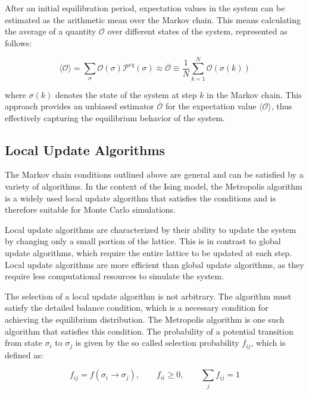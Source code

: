 After an initial equilibration period, expectation values in the system can be
estimated as the arithmetic mean over the Markov chain. This means calculating
the average of a quantity \( \mathcal{O} \) over different states of the system,
represented as follows:

\begin{equation}
    \langle \mathcal{O} \rangle = \sum_{\sigma}\mathcal{O}(\sigma)\mathcal{P}^{eq}(\sigma) \approx \overline{\mathcal{O}} \equiv \frac{1}{N} \sum_{k=1}^{N}\mathcal{O}(\sigma(k))
\end{equation}

where \( \sigma(k) \) denotes the state of the system at step \( k \) in the
Markov chain. This approach provides an unbiased estimator
$\overline{\mathcal{O}} $ for the expectation value \( \langle \mathcal{O}
\rangle \), thus effectively capturing the equilibrium behavior of the system.

\subsection{Local Update Algorithms}

The Markov chain conditions outlined above are general and can be satisfied by a
variety of algorithms. In the context of the Ising model, the Metropolis
algorithm is a widely used local update algorithm that satisfies the conditions
and is therefore suitable for Monte Carlo simulations.

Local update algorithms are characterized by their ability to update the system
by changing only a small portion of the lattice. This is in contrast to global
update algorithms, which require the entire lattice to be updated at each step.
Local update algorithms are more efficient than global update algorithms, as
they require less computational resources to simulate the system.

The selection of a local update algorithm is not arbitrary. The algorithm must
satisfy the detailed balance condition, which is a necessary condition for
achieving the equilibrium distribution. The Metropolis algorithm is one such
algorithm that satisfies this condition. The probability of a potential
transition from state \( \sigma_i \) to \( \sigma_j \) is given by the so called
selection probability \( f_{ij} \), which is defined as:

\begin{equation}
    f_{ij} = f(\sigma_i \rightarrow \sigma_j), \qquad f_{ii} \geq 0, \qquad \sum_j f_{ij} = 1
\end{equation}

